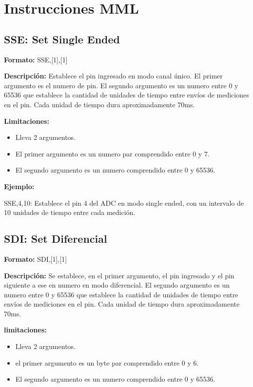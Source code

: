 \appendix

\chapter{Instrucciones MML}\label{ap:instrucciones}

\section{SSE: Set Single Ended} %
\label{sub:sse_set_single_ended}


\textbf{Formato:} SSE,[1],[1]

\textbf{Descripción:}
Establece el pin ingresado en modo canal único. El primer argumento es el numero de pin. El segundo argumento es un numero entre 0 y 65536 que establece la cantidad de unidades de tiempo entre envíos de mediciones en el pin. Cada unidad de tiempo dura aproximadamente 70ms.

\textbf{Limitaciones:}
\begin{itemize}
  \item Lleva 2 argumentos.
  \item El primer argumento es un numero par comprendido entre 0 y 7.
  \item El segundo argumento es un numero comprendido entre 0 y 65536.
\end{itemize}

\textbf{Ejemplo:}

SSE,4,10: Establece el pin 4 del ADC en modo single ended, con un intervalo de 10 unidades de tiempo entre cada medición.


\section{SDI: Set Diferencial} %
\label{sub:sdi_set_diferencial}


\textbf{Formato:} SDI,[1],[1]

\textbf{Descripción:}
Se establece, en el primer argumento, el pin ingresado y el pin siguiente a ese en numero en modo diferencial. El segundo argumento es un numero entre 0 y 65536 que establece la cantidad de unidades de tiempo entre envíos de mediciones en el pin. Cada unidad de tiempo dura aproximadamente 70ms.

\textbf{limitaciones:}
\begin{itemize}
  \item Lleva 2 argumentos.
  \item el primer argumento es un byte par comprendido entre 0 y 6.
  \item El segundo argumento es un numero comprendido entre 0 y 65536.
\end{itemize}

